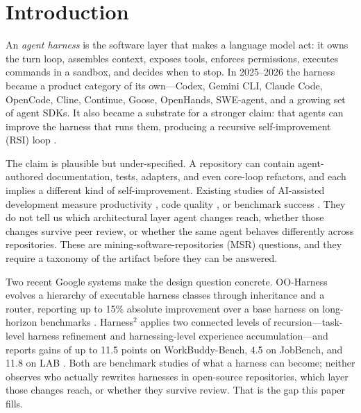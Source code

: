 \documentclass[sigconf,review]{acmart}
\begin{document}

\maketitle

\section{Introduction}

An \emph{agent harness} is the software layer that makes a language model act: it owns the turn loop, assembles context, exposes tools, enforces permissions, executes commands in a sandbox, and decides when to stop. In 2025--2026 the harness became a product category of its own---Codex, Gemini CLI, Claude Code, OpenCode, Cline, Continue, Goose, OpenHands, SWE-agent, and a growing set of agent SDKs. It also became a substrate for a stronger claim: that agents can improve the harness that runs them, producing a recursive self-improvement (RSI) loop \citep{lehman1980,godfrey2008}.

The claim is plausible but under-specified. A repository can contain agent-authored documentation, tests, adapters, and even core-loop refactors, and each implies a different kind of self-improvement. Existing studies of AI-assisted development measure productivity \citep{peng2023,ziegler2022}, code quality \citep{barke2023}, or benchmark success \citep{jimenez2024,yang2024,wang2025}. They do not tell us which architectural layer agent changes reach, whether those changes survive peer review, or whether the same agent behaves differently across repositories. These are mining-software-repositories (MSR) questions, and they require a taxonomy of the artifact before they can be answered.

Two recent Google systems make the design question concrete. OO-Harness evolves a hierarchy of executable harness classes through inheritance and a router, reporting up to 15\% absolute improvement over a base harness on long-horizon benchmarks \citep{li2026ooharness}. Harness$^2$ applies two connected levels of recursion---task-level harness refinement and harnessing-level experience accumulation---and reports gains of up to 11.5 points on WorkBuddy-Bench, 4.5 on JobBench, and 11.8 on LAB \citep{xu2026harness2}. Both are benchmark studies of what a harness can become; neither observes who actually rewrites harnesses in open-source repositories, which layer those changes reach, or whether they survive review. That is the gap this paper fills.
\end{document}
